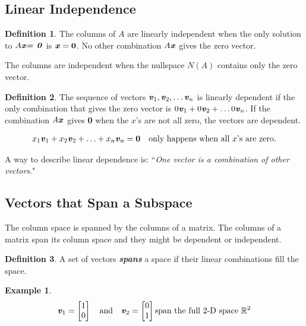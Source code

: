 \documentclass[12pt, letterpaper]{article}
\newcommand{\R}[1]{$\mathbb{R}^{#1}$}
\newcommand{\V}[1]{\textbf{\textit{#1}}}
\newcommand{\A}{$A$}
\newcommand{\x}{\textbf{\textit{x}}}
\newcommand{\nullsystem}{\textbf{\textit{\A \x = 0}}}
\theoremstyle{definition}
\newtheorem{definition}{Definition}[section]
\newtheorem{example}{Example}
\begin{document}
	
\subsection{Linear Independence}
		\begin{definition}
			The columns of $A$ are linearly independent when the only solution to $\nullsystem$ is $\V{x} = \textbf{0}$. No other combination $A\V{x}$ gives the zero vector.
		\end{definition}
	
		The columns are independent when the nullspace $N(A)$ contains only the zero vector.
	
		\begin{definition}
			The sequence of vectors $\V{v}_1, \V{v}_2, \ldots \V{v}_n$ is linearly dependent if the only combination that gives the zero vector is $0\V{v}_1 + 0\V{v}_2 + \ldots 0\V{v}_n$. If the combination $A\V{x}$ gives \textbf{0} when the $x$'s are not all zero, the vectors are dependent.
			
			\begin{gather*}
				x_1 \V{v}_1+ x_2 \V{v}_2 + \ldots + x_n \V{v}_n = \textbf{0} \quad \text{only happens when all $x$'s are zero.}
			\end{gather*}
		\end{definition}
	
	A way to describe linear dependence is: ``\textit{One vector is a combination of other vectors}." 	
	
\subsection{Vectors that Span a Subspace}
		The column space is spanned by the columns of a matrix. The columns of a matrix span its column space and they might be dependent or independent.
					\begin{definition}
						A set of vectors \textbf{\textit{spans}} a space if their linear combinations fill the space.
					\end{definition}
		
				
					\begin{example}
						\begin{gather*}
							\V{v}_1 = \begin{bmatrix}1 \\ 0 \end{bmatrix} \quad \text{and} \quad \V{v}_2 = \begin{bmatrix}0 \\ 1 \end{bmatrix} \text{span the full 2-D space \R{2}}
						\end{gather*}
					\end{example}
				
\end{document}
